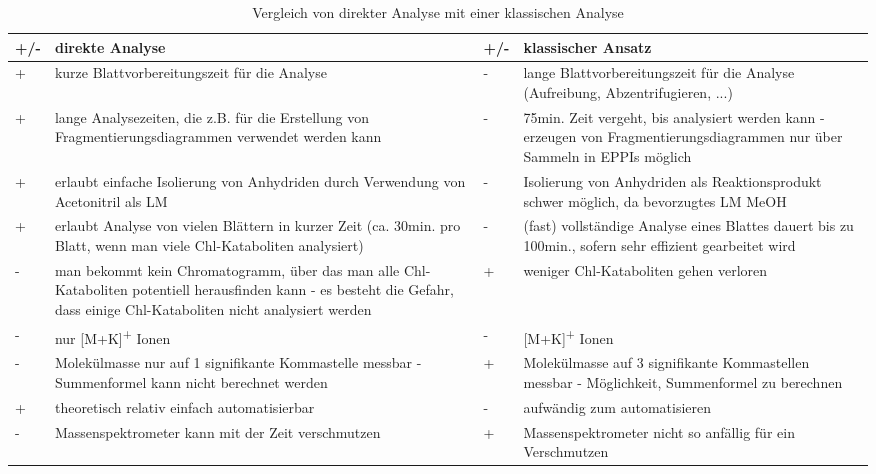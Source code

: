 \begin{table*}[!htbp]\centering
  
  \begin{tabular}{C{1cm}C{6cm}C{1cm}C{6cm}}\toprule
 +/- & direkte Analyse & +/- & klassischer Ansatz \\
\midrule
{} + & kurze Blattvorbereitungszeit für die Analyse & - & lange Blattvorbereitungszeit für die Analyse (Aufreibung, Abzentrifugieren, ...) \\
 + & lange Analysezeiten, die z.B. für die Erstellung von Fragmentierungsdiagrammen verwendet werden kann & - & 75min. Zeit vergeht, bis analysiert werden kann - erzeugen von Fragmentierungsdiagrammen nur über Sammeln in EPPIs möglich \\ 
 + & erlaubt einfache Isolierung von Anhydriden durch Verwendung von Acetonitril als LM & - & Isolierung von Anhydriden als Reaktionsprodukt schwer möglich, da bevorzugtes LM MeOH \\
 + & erlaubt Analyse von vielen Blättern in kurzer Zeit (ca. 30min. pro Blatt, wenn man viele Chl-Kataboliten analysiert) & - & (fast) vollständige Analyse eines Blattes dauert bis zu 100min., sofern sehr effizient gearbeitet wird \\ 
 - & man bekommt kein Chromatogramm, über das man alle Chl-Kataboliten potentiell herausfinden kann - es besteht die Gefahr, dass einige Chl-Kataboliten nicht analysiert werden & + & weniger Chl-Kataboliten gehen verloren \\
 - & nur [M+K]\textsuperscript{+} Ionen & - & [M+K]\textsuperscript{+} Ionen \\ 
 - & Molekülmasse nur auf 1 signifikante Kommastelle messbar - Summenformel kann nicht berechnet werden & + & Molekülmasse auf 3 signifikante Kommastellen messbar - Möglichkeit, Summenformel zu berechnen \\
 + & theoretisch relativ einfach automatisierbar & - & aufwändig zum automatisieren \\ 
  - & Massenspektrometer kann mit der Zeit verschmutzen & + & Massenspektrometer nicht so anfällig für ein Verschmutzen \\
\bottomrule
  \end{tabular}
  
  \caption[Vergleich beider Methoden, Quelle: Autor]{Vergleich von direkter Analyse mit einer klassischen Analyse}
  \label{tab:ComparisonDirectClassic}
\end{table*}

